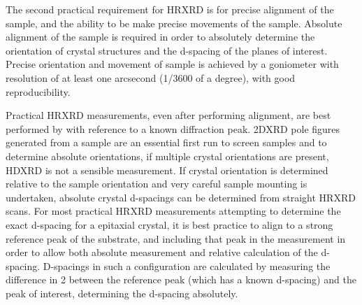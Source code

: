 The second practical requirement for HRXRD is for precise alignment of the sample, and the ability to be make precise movements of the sample. Absolute alignment of the sample is required in order to absolutely determine the orientation of crystal structures and the d-spacing of the planes of interest. Precise orientation and movement of sample is achieved by a goniometer with resolution of at least one arcsecond (1/3600 of a degree), with good reproducibility.

Practical HRXRD measurements, even after performing alignment, are best performed by with reference to a known diffraction peak. 2DXRD pole figures generated from a sample are an essential first run to screen samples and to determine absolute orientations, if multiple crystal orientations are present, HDXRD is not a sensible measurement. If crystal orientation is determined relative to the sample orientation and very careful sample mounting is undertaken, absolute crystal d-spacings can be determined from straight HRXRD scans. For most practical HRXRD measurements attempting to determine the exact d-spacing for a epitaxial crystal, it is best practice to align to a strong reference peak of the substrate, and including that peak in the measurement in order to allow both absolute measurement and relative calculation of the d-spacing. D-spacings in such a configuration are calculated by measuring the difference in 2\straighttheta{} between the reference peak (which has a known d-spacing) and the peak of interest, determining the d-spacing absolutely.

